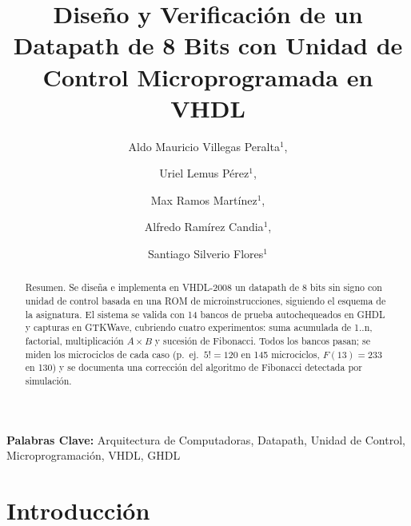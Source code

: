 \documentclass[llncs]{llncs}
\begin{document}
\title{Diseño y Verificación de un Datapath de 8 Bits con Unidad de Control Microprogramada en {VHDL}}

\author{Aldo Mauricio Villegas Peralta$^{1}$,%
\and Uriel Lemus Pérez$^{1}$,%
\and Max Ramos Martínez$^{1}$,%
\and Alfredo Ramírez Candia$^{1}$,%
\and Santiago Silverio Flores$^{1}$}


\maketitle

\begin{abstract}
Resumen. Se diseña e implementa en VHDL-2008 un datapath de 8 bits sin
signo con unidad de control basada en una ROM de microinstrucciones,
siguiendo el esquema de la asignatura. El sistema se valida con 14 bancos
de prueba autochequeados en GHDL y capturas en GTKWave, cubriendo cuatro
experimentos: suma acumulada de 1..n, factorial, multiplicación $A \times
B$ y sucesión de Fibonacci. Todos los bancos pasan; se miden los
microciclos de cada caso (p.\ ej.\ $5! = 120$ en 145 microciclos,
$F(13) = 233$ en 130) y se documenta una corrección del algoritmo de
Fibonacci detectada por simulación.
\end{abstract}

\noindent\textbf{Palabras Clave:} Arquitectura de Computadoras, Datapath,
Unidad de Control, Microprogramación, VHDL, GHDL

\section{Introducción}
\label{sec:intro}
\end{document}

